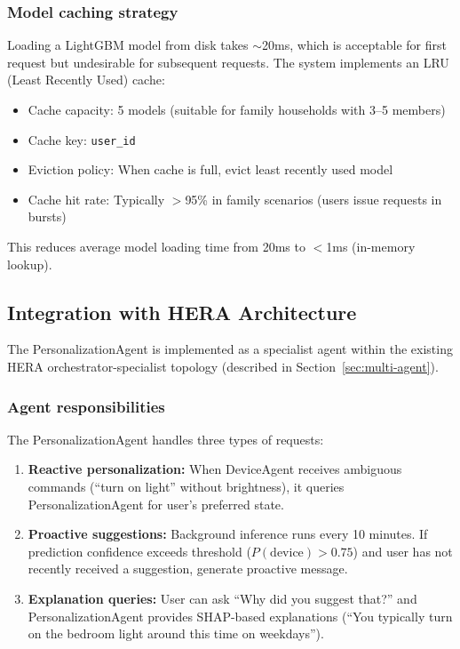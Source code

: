 \subsubsection{Model caching strategy}

Loading a LightGBM model from disk takes $\sim$20ms, which is acceptable for first request but undesirable for subsequent requests. The system implements an LRU (Least Recently Used) cache:

\begin{itemize}
    \item Cache capacity: 5 models (suitable for family households with 3--5 members)
    \item Cache key: \texttt{user\_id}
    \item Eviction policy: When cache is full, evict least recently used model
    \item Cache hit rate: Typically $>$95\% in family scenarios (users issue requests in bursts)
\end{itemize}

This reduces average model loading time from 20ms to $<$1ms (in-memory lookup).

\subsection{Integration with HERA Architecture}
\label{sec:hera-integration}

The PersonalizationAgent is implemented as a specialist agent within the existing HERA orchestrator-specialist topology (described in Section~\ref{sec:multi-agent}).

\subsubsection{Agent responsibilities}

The PersonalizationAgent handles three types of requests:

\begin{enumerate}
    \item \textbf{Reactive personalization:} When DeviceAgent receives ambiguous commands (``turn on light'' without brightness), it queries PersonalizationAgent for user's preferred state.
    
    \item \textbf{Proactive suggestions:} Background inference runs every 10 minutes. If prediction confidence exceeds threshold ($P(\text{device}) > 0.75$) and user has not recently received a suggestion, generate proactive message.
    
    \item \textbf{Explanation queries:} User can ask ``Why did you suggest that?'' and PersonalizationAgent provides SHAP-based explanations (``You typically turn on the bedroom light around this time on weekdays'').
\end{enumerate}

